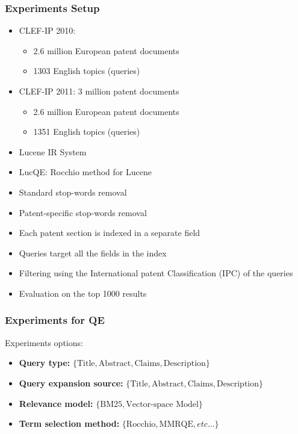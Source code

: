 \documentclass[xcolor=x11names,compress]{beamer}
\renewcommand{\(}{\begin{columns}}
\renewcommand{\)}{\end{columns}}
\newcommand{\<}[1]{\begin{column}{#1}}
\renewcommand{\>}{\end{column}}
\begin{document}
\begin{frame}
\frametitle{Experiments Setup}
\begin{itemize}
\item CLEF-IP 2010: 
	\begin{itemize}
		\item 2.6 million European patent documents
		\item 1303 English topics (queries)
	\end{itemize}
\item CLEF-IP 2011: 3 million patent documents
	\begin{itemize}
		\item 2.6 million European patent documents
		\item 1351 English topics (queries)
	\end{itemize}
\item Lucene IR System
\item LucQE: Rocchio method for Lucene
\item Standard stop-words removal
\item Patent-specific stop-words removal \citep{Magdy2012}
\item Each patent section is indexed in a separate field
\item Queries target all the fields in the index
\item Filtering using the International patent Classification (IPC) of the queries \citep{Lopez2009,Roda2009}
\item Evaluation on the top 1000 results
\end{itemize}
\end{frame}


\begin{frame}
\frametitle{Experiments for QE}

Experiments options:

\begin{itemize}
\item \textbf{\footnotesize{}Query type:}{\footnotesize{} $\{\mathrm{Title},\mathrm{Abstract},\mathrm{Claims},\mathrm{Description}\}$ }{\footnotesize \par}
\item \textbf{\footnotesize{}Query expansion source:}{\footnotesize{} $\{\mathrm{Title},\mathrm{Abstract},\mathrm{Claims},\mathrm{Description}\}$ }{\footnotesize \par}
\item \textbf{\footnotesize{}Relevance model:}{\footnotesize{} $\{\mathrm{BM25},\mbox{Vector-space Model}\}$ }{\footnotesize \par}
\item \textbf{\footnotesize{}Term selection method:}{\footnotesize{} $\{\mathrm{Rocchio},\mathrm{MMRQE},etc...\}$ }{\footnotesize \par}
\end{itemize}
\end{frame}
\end{document}
